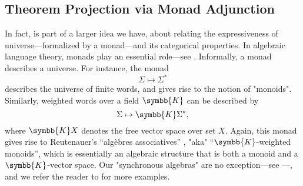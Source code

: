 



\subsection{Theorem Projection via Monad Adjunction}
\label{sec:theorem-projection-monad-adjunction}

In fact, 
is part of a larger idea we have, about relating the expressiveness of
universe---formalized by a monad---and its categorical properties. 
In algebraic language theory, monads play an essential role---see .
Informally, a monad describes a universe.
For instance, the monad
\[
	\Sigma \mapsto \Sigma^*
\]
describes the universe of finite words, and gives rise to the notion of
"monoids". Similarly, weighted words over a field $\symbb{K}$ can be described by
\[
	\Sigma \mapsto \symbb{K}\Sigma^*,
\]
where $\symbb{K}X$ denotes the free vector space over set $X$.
Again, this monad gives rise to Reutenauer's ``algèbres associatives''
\cite{Reutenauer1980SeriesFormelles}, "aka" ``$\symbb{K}$-weighted monoids'',
which is essentially an algebraic structure that is both a monoid and a
$\symbb{K}$-vector space.
Our "synchronous algebras" are no exception---see ---,
and we refer the reader to \cite[\S~4]{Bojanczyk2020MSO} for more examples.

